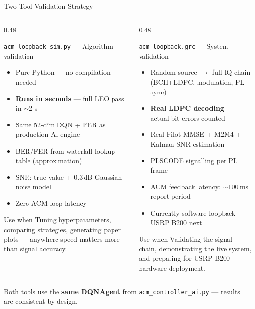 \documentclass[aspectratio=169,10pt]{beamer}
\begin{document}
\begin{frame}[shrink=5]{Two-Tool Validation Strategy}
\begin{columns}[T]
  \begin{column}{0.48\textwidth}
    \begin{block}{\texttt{acm\_loopback\_sim.py} — Algorithm validation}
      \begin{itemize}\small
        \item Pure Python — no compilation needed
        \item \textbf{Runs in seconds} — full LEO pass in $\sim$2 s
        \item Same 52-dim DQN + PER as production AI engine
        \item BER/FER from waterfall lookup table (approximation)
        \item SNR: true value + 0.3\,dB Gaussian noise model
        \item Zero ACM loop latency
      \end{itemize}
    \end{block}
    \vspace{0.4em}
    \begin{notebox}{Use when}
      \small Tuning hyperparameters, comparing strategies, generating paper plots — anywhere speed matters more than signal accuracy.
    \end{notebox}
  \end{column}
  \begin{column}{0.48\textwidth}
    \begin{alertblock}{\texttt{acm\_loopback.grc} — System validation}
      \begin{itemize}\small
        \item Random source $\to$ full IQ chain (BCH+LDPC, modulation, PL sync)
        \item \textbf{Real LDPC decoding} — actual bit errors counted
        \item Real Pilot-MMSE + M2M4 + Kalman SNR estimation
        \item PLSCODE signalling per PL frame
        \item ACM feedback latency: $\sim$100\,ms report period
        \item Currently software loopback — USRP B200 next
      \end{itemize}
    \end{alertblock}
    \vspace{0.4em}
    \begin{resultbox}{Use when}
      \small Validating the signal chain, demonstrating the live system, and preparing for USRP B200 hardware deployment.
    \end{resultbox}
  \end{column}
\end{columns}
\vspace{0.4em}
\begin{center}
\small\textcolor{NUSgray}{Both tools use the \textbf{same DQNAgent} from \texttt{acm\_controller\_ai.py} — results are consistent by design.}
\end{center}
\end{frame}
\end{document}
